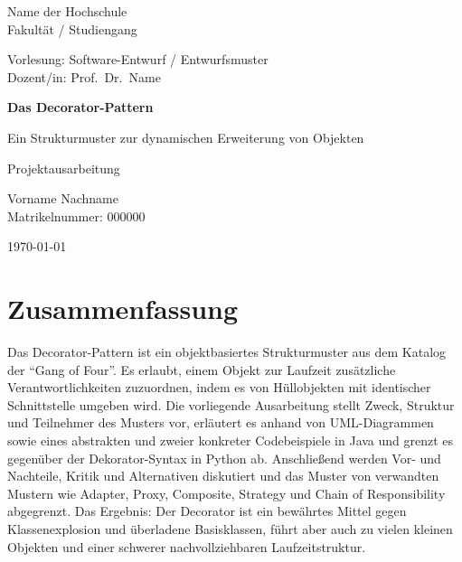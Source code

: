 \documentclass[a4paper,11pt,toc=listof,toc=bibliography]{scrartcl}
\newcommand{\titel}{Das Decorator-Pattern}
\newcommand{\untertitel}{Ein Strukturmuster zur dynamischen Erweiterung von Objekten}
\newcommand{\autor}{Vorname Nachname}
\newcommand{\matrikel}{Matrikelnummer: 000000}
\begin{document}
\begin{titlepage}
  \centering
  {\large Name der Hochschule\\Fakultät / Studiengang\par}
  \vspace{1.5cm}
  {\large Vorlesung: Software-Entwurf / Entwurfsmuster\\
   Dozent/in: Prof.\ Dr.\ Name\par}
  \vspace{3cm}
  {\Huge\bfseries \titel\par}
  \vspace{0.6cm}
  {\Large \untertitel\par}
  \vspace{1.2cm}
  {\large Projektausarbeitung\par}
  \vfill
  {\large \autor\\ \matrikel\par}
  \vspace{0.8cm}
  {\large \today\par}
\end{titlepage}

\setcounter{page}{2}

\section*{Zusammenfassung}
Das Decorator-Pattern ist ein objektbasiertes Strukturmuster aus dem Katalog der \enquote{Gang of Four}. Es erlaubt, einem Objekt zur Laufzeit zusätzliche Verantwortlichkeiten zuzuordnen, indem es von Hüllobjekten mit identischer Schnittstelle umgeben wird. Die vorliegende Ausarbeitung stellt Zweck, Struktur und Teilnehmer des Musters vor, erläutert es anhand von UML-Diagrammen sowie eines abstrakten und zweier konkreter Codebeispiele in Java und grenzt es gegenüber der Dekorator-Syntax in Python ab. Anschließend werden Vor- und Nachteile, Kritik und Alternativen diskutiert und das Muster von verwandten Mustern wie Adapter, Proxy, Composite, Strategy und Chain of Responsibility abgegrenzt. Das Ergebnis: Der Decorator ist ein bewährtes Mittel gegen Klassenexplosion und überladene Basisklassen, führt aber auch zu vielen kleinen Objekten und einer schwerer nachvollziehbaren Laufzeitstruktur.
\end{document}

